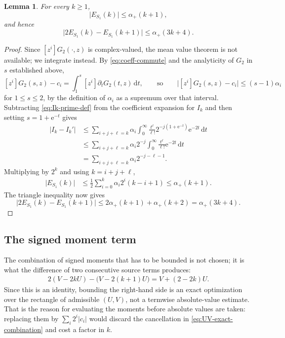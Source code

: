 \documentclass[11pt]{amsart}
\theoremstyle{plain}
\newtheorem{lemma}[theorem]{Lemma}
\theoremstyle{definition}
\newcommand{\e}{\mathrm e}
\newcommand{\dd}{\,\mathrm d}
\newcommand{\abs}[1]{\lvert #1\rvert}
\begin{document}
\begin{lemma}\label{lem:S1-bound}
For every $k\geq1$,
\begin{equation}\label{eq:S1-bound}
 \abs{E_{S_1}(k)}\leq\alpha_+(k+1),
\end{equation}
and hence
\begin{equation}\label{eq:S1-difference-bound}
 \abs{2E_{S_1}(k)-E_{S_1}(k+1)}\leq\alpha_+(3k+4).
\end{equation}
\end{lemma}

\begin{proof}
Since $[z^i]G_2(\cdot,z)$ is complex-valued, the mean value theorem is not
available; we integrate instead. By \eqref{eq:coeff-commute} and the
analyticity of $G_2$ in $s$ established above,
\[
 [z^i]G_2(s,z)-c_i=\int_1^s[z^i]\partial_tG_2(t,z)\dd t,
 \qquad\text{so}\qquad
 \abs{[z^i]G_2(s,z)-c_i}\leq(s-1)\alpha_i
\]
for $1\leq s\leq2$, by the definition of $\alpha_i$ as a supremum over that
interval.
Subtracting \eqref{eq:Ik-prime-def} from the coefficient expansion for $I_k$
and then setting $s=1+\e^{-t}$ gives
\begin{align*}
 \abs{I_k-I_k'}
 &\leq\sum_{i+j+\ell=k}\alpha_i
   \int_0^\infty\frac{t^\ell}{\ell!}
       2^{-j(1+\e^{-t})}\e^{-2t}\dd t\\
 &\leq\sum_{i+j+\ell=k}\alpha_i2^{-j}
   \int_0^\infty\frac{t^\ell}{\ell!}\e^{-2t}\dd t\\
 &=\sum_{i+j+\ell=k}\alpha_i2^{-j-\ell-1}.
\end{align*}
Multiplying by $2^k$ and using $k=i+j+\ell$,
\begin{align*}
 \abs{E_{S_1}(k)}
 &\leq\frac12\sum_{i=0}^k\alpha_i2^i(k-i+1)
 \leq\alpha_+(k+1).
\end{align*}
The triangle inequality now gives
\[
 \abs{2E_{S_1}(k)-E_{S_1}(k+1)}
 \leq2\alpha_+(k+1)+\alpha_+(k+2)=\alpha_+(3k+4).
\]
\end{proof}

\subsection{The signed moment term}

The combination of signed moments that has to be bounded is not chosen; it is
what the difference of two consecutive source terms produces:
\begin{align}
 2(V-2kU)-\bigl(V-2(k+1)U\bigr)=V+(2-2k)U.
 \label{eq:UV-exact-combination}
\end{align}
Since this is an identity, bounding the right-hand side is an exact
optimization over the rectangle of admissible $(U,V)$, not a termwise
absolute-value estimate. That is the reason for evaluating the moments before
absolute values are taken: replacing them by $\sum_i2^i\abs{c_i}$ would
discard the cancellation in \eqref{eq:UV-exact-combination} and cost a factor
in $k$.
\end{document}

